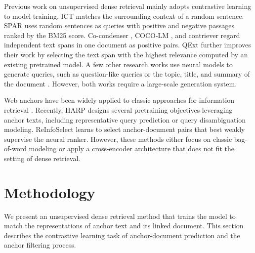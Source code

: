 Previous work on unsupervised dense retrieval mainly adopts contrastive learning to model training.
ICT \cite{ICT} matches the surrounding context of a random sentence.
SPAR \cite{SPAR} uses random sentences as queries with positive and negative passages ranked by the BM25 score.
Co-condenser \cite{cocondenser}, COCO-LM \cite{COCOLM}, and contriever \cite{contriever} regard independent text spans in one document as positive pairs.
QExt \cite{QExt} further improves their work by selecting the text span with the highest relevance computed by an existing pretrained model.
A few other research works use neural models to generate queries, such as question-like queries \cite{InPars} or the topic, title, and summary of the document \cite{QExt}.
However, both works require a large-scale generation system.

Web anchors have been widely applied to classic approaches for information retrieval \cite{AnchorAnalysis,Anchorcollaborative,AnchorContent,AnchorMining,AnchorStructure}. 
Recently, HARP \cite{hyperlinkPretrain} designs several pretraining objectives leveraging anchor texts, including representative query prediction or query disambiguation modeling.
ReInfoSelect \cite{ReinfoSelect} learns to select anchor-document pairs that best weakly supervise the neural ranker.
However, these methods either focus on classic bag-of-word modeling or apply a cross-encoder architecture that does not fit the setting of dense retrieval.






\section{Methodology}
We present an unsupervised dense retrieval method that trains the model to match the representations of anchor text and its linked document.
This section describes the contrastive learning task of anchor-document prediction and the anchor filtering process.


